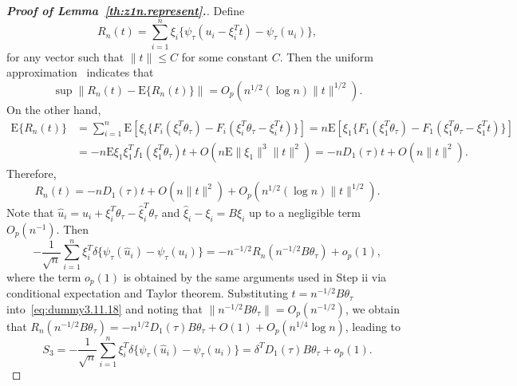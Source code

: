 \documentclass[times,sort&compress,3p]{elsarticle}
\theoremstyle{plain}%
\theoremstyle{definition}
\newcommand{\bD}{{D}}
\newcommand{\bB}{{B}}
\newcommand{\bt}{{t}}
\newcommand{\btheta}{{\theta}}
\newcommand{\bxi}{{\xi}}
\begin{document}
\begin{proof}[\textbf{\upshape Proof of Lemma~\ref{th:z1n.represent}.}]
	Define 
	\begin{equation}
		R_n(\bt) = \sum_{i = 1}^n \bxi_{i} \{\psi_{\tau}(u_i - \bxi_{i}^T \bt ) - \psi_{\tau}(u_i)\},
	\end{equation}
	for any vector such that $\|\bt\| \leq C$ for some constant $C$. Then the uniform approximation~\citep{He+Shao:96} indicates that 
	\begin{equation}
		\sup \| R_n(\bt) - \text{E} \{R_n(\bt)\} \| = O_p(n^{1/2} (\log n) \|\bt\|^{1/2}). 
	\end{equation} 
	On the other hand, 
	\begin{align}
		\text{E} \{R_n(\bt)\} & = \sum_{i = 1}^n \text{E} [\bxi_{i} \{F_i(\bxi_{i}^T \btheta_{\tau} ) - F_i(\bxi_{i}^T \btheta_{\tau}  - \bxi_{i}^T \bt)\}] = n \text{E} [\bxi_1 \{F_1(\bxi_1^T \btheta_{\tau} ) - F_1(\bxi_1^T \btheta_{\tau}  - \bxi_1^T \bt)\} ]\\
		& = - n \text{E} \bxi_1 \bxi_1^T f_1(\bxi_1^T \btheta_{\tau} ) \bt + O(n \text{E} \|\bxi_1\|^3 \| \bt\|^2) = -n \bD_1(\tau) \bt + O(n \|\bt\|^2). 
	\end{align}
	Therefore, 
	\begin{equation}
		\label{eq:dummy3.11.18}
		R_n(\bt) = -n \bD_1(\tau) \bt + O(n \|\bt\|^2) + O_p\left(n^{1/2} (\log n) \|\bt\|^{1/2}\right). 
	\end{equation}
	Note that $\widehat{u}_i = u_i + \bxi_{i}^T \btheta_{\tau}  - \widehat{\bxi}_i^T \btheta_{\tau} $ and $\widehat{\bxi}_i - \bxi_i = \bB \bxi_i$ up to a negligible term $O_p(n^{-1})$. Then  
	\begin{equation}
		-\frac{1}{\sqrt{n}} \sum_{i = 1}^n \bxi_{i}^T {\delta}\{ \psi_\tau(\widehat{u}_i) - \psi_\tau({u}_i)\} = -n^{-1/2} R_n(n^{-1/2} \bB \btheta_{\tau} ) + o_p(1),
	\end{equation} 
	where the term $o_p(1)$ is obtained by the same arguments used in Step ii via conditional expectation and Taylor theorem. Substituting $\bt = n^{-1/2} \bB \btheta_{\tau}$ into~\eqref{eq:dummy3.11.18} and noting that $\|n^{-1/2} \bB \btheta_{\tau}  \| = O_p(n^{-1/2})$, we obtain that $R_n(n^{-1/2} \bB \btheta_{\tau} ) =  -n^{1/2} \bD_1(\tau)  \bB \btheta_{\tau}  + O(1) + O_p(n^{1/4} \log n)$, leading to   
	\begin{equation}
		\label{eq:dummy4.11.18}
		S_3 = -\frac{1}{\sqrt{n}} \sum_{i = 1}^n \bxi_{i}^T {\delta}\{ \psi_\tau(\widehat{u}_i) - \psi_\tau({u}_i)\} = {\delta}^T \bD_1(\tau)  \bB \btheta_{\tau}  + o_p(1). 
	\end{equation}

\end{proof}
\end{document}
